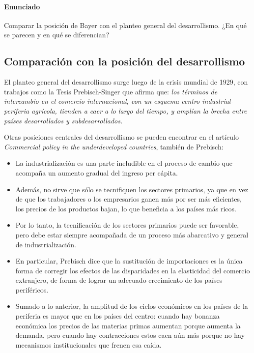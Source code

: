 \paragraph{Enunciado}
 Comparar la posición de Bayer con el planteo general del desarrollismo. ¿En qué se parecen y en qué se diferencian?

 \subsection{Comparación con la posición del desarrollismo}

 El planteo general del desarrollismo surge luego de la crisis mundial de 1929, con trabajos como la Tesis Prebisch-Singer que afirma que:
 \textit{los términos de intercambio en el comercio internacional, con un esquema centro industrial-periferia agrícola, tienden a caer a lo largo del tiempo,  y amplían la brecha entre países desarrollados y subdesarrollados.}


Otras posiciones centrales del desarrollismo se pueden encontrar en el artículo \textit{Commercial policy in the underdeveloped countries}, también de Prebisch:

 \begin{itemize}
    \item La industrialización es una parte ineludible en el proceso de cambio que acompaña un aumento gradual del ingreso per cápita.
    \item Además, no sirve que sólo se tecnifiquen los sectores primarios, ya que en vez de que los trabajadores o los empresarios ganen más por ser más eficientes, los precios de los productos bajan, lo que beneficia a los países más ricos.
    \item Por lo tanto, la tecnificación de los sectores primarios puede ser favorable, pero debe estar siempre acompañada de un proceso más abarcativo y general de industrialización.
    \item En particular, Prebisch dice que la sustitución de importaciones es la única forma de corregir los efectos de las disparidades en la elasticidad del comercio extranjero, de forma de lograr un adecuado crecimiento de los países periféricos.
    \item Sumado a lo anterior, la amplitud de los ciclos económicos en los países de la periferia es mayor que en los países del centro: cuando hay bonanza económica los precios de las materias primas aumentan porque aumenta la demanda, pero cuando hay contracciones estos caen aún más porque no hay mecanismos institucionales que frenen esa caída.
 \end{itemize}

